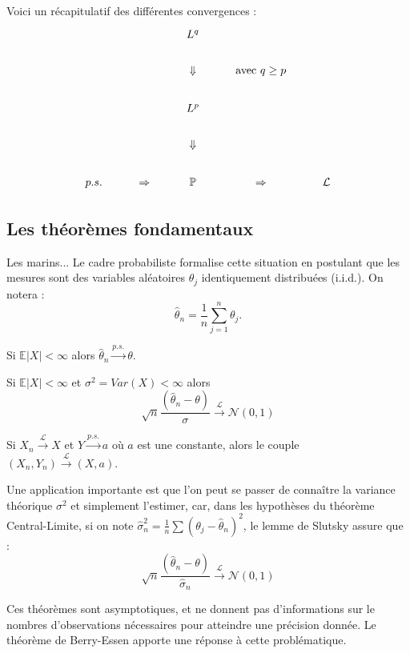 Voici un récapitulatif des différentes convergences :
\[\begin{tikzcd}
     &              & L^q  &                   &          \\
     &              & \Downarrow &    \text{avec }q \geq p       &            \\
     &              & L^p     &               &            \\
     &              & \Downarrow &           &            \\
p.s. & \Rightarrow  & \mathbb P & \Rightarrow & \mathcal L
\end{tikzcd}\]

\subsection{Les théorèmes fondamentaux}

Les marins... Le cadre probabiliste formalise cette situation en postulant que les mesures sont des variables aléatoires $\theta_j$ identiquement distribuées (i.i.d.). On notera : 
\[\hat\theta_n = \frac{1}{n}\sum_{j=1}^n \theta_j.\]

\begin{thm}[LGN]
Si $\mathbb E |X|<\infty $ alors $\hat \theta_n \overset{p.s.}{\longrightarrow}\theta$.
\end{thm}

\begin{thm}[TCL]
Si $\mathbb E |X|<\infty $ et $\sigma^2=Var(X)<\infty$ alors \[\sqrt{n}\frac{(\hat \theta_n -\theta)}{\sigma}\overset{\mathcal L}{\longrightarrow}\mathcal{N}(0,1)\]
\end{thm}

\begin{lem}[Slutsky]
Si $X_n \overset{\mathcal L}{\longrightarrow} X$ et $Y \overset{p.s.}{\longrightarrow}a$ où $a$ est une constante, alors le couple $(X_n,Y_n) \overset{\mathcal L}{\longrightarrow} (X,a)$.
\end{lem}

Une application importante est que l'on peut se passer de connaître la variance théorique $\sigma^2$ et simplement l'estimer, car, dans les hypothèses du théorème Central-Limite, si on note $\hat\sigma_n^2 =\frac{1}{n}\sum (\theta_j -\hat{\theta}_n)^2$, le lemme de Slutsky assure que :
\[\sqrt{n}\frac{(\hat\theta_n - \theta)}{\hat\sigma_n} \overset{\mathcal L}{\longrightarrow} \mathcal N(0,1)\]

Ces théorèmes sont asymptotiques, et ne donnent pas d'informations sur le nombres d'observations nécessaires pour atteindre une précision donnée. Le théorème de Berry-Essen apporte une réponse à cette problématique.\\

